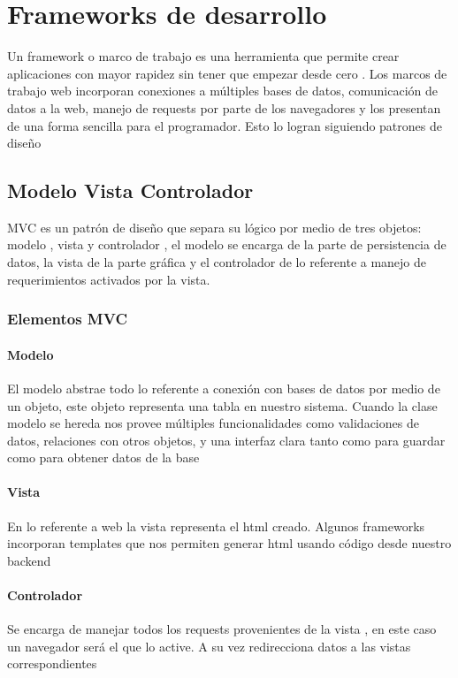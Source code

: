\section{Frameworks de desarrollo}
Un framework o marco de trabajo es una herramienta que permite crear
aplicaciones con mayor rapidez sin tener que empezar desde cero . Los marcos de
trabajo web incorporan conexiones a múltiples bases de datos, comunicación de
datos a la web, manejo de requests por parte de los navegadores y los presentan
de una forma sencilla para el programador. Esto lo logran siguiendo patrones de
diseño

\subsection{Modelo Vista Controlador}
MVC es un patrón de diseño que separa su lógico por medio de tres objetos:
modelo , vista y controlador , el modelo se encarga de la parte de persistencia
de datos, la vista de la parte gráfica y el controlador de lo referente a
manejo de requerimientos activados por la vista.

\subsubsection{Elementos MVC}

\paragraph{Modelo}
El modelo abstrae todo lo referente a conexión con bases
de datos por medio de un objeto, este objeto representa una tabla en nuestro
sistema. Cuando la clase modelo se hereda nos provee múltiples funcionalidades
como validaciones de datos, relaciones con otros objetos, y una interfaz clara
tanto como para guardar como para obtener datos de la base

\paragraph{Vista}
En lo referente a web la vista representa el html creado. Algunos frameworks
incorporan templates que nos permiten generar html usando código desde nuestro
backend

\paragraph{Controlador} Se encarga de manejar todos los requests
provenientes de la vista , en este caso un navegador será el que lo active. A
su vez redirecciona datos a las vistas correspondientes

